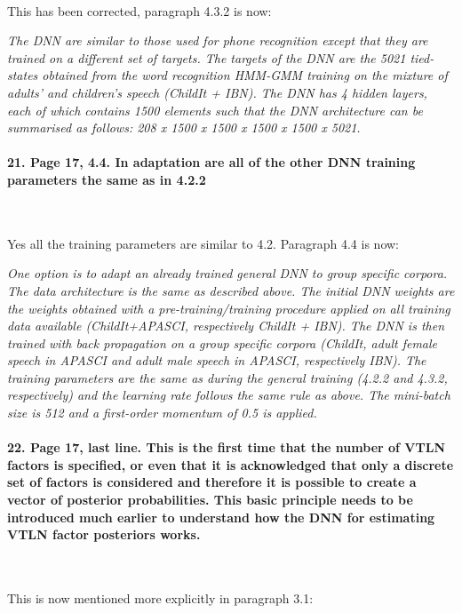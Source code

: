 \documentclass[]{article}
\begin{document}
~

This has been corrected, paragraph 4.3.2 is now:

\textit{The DNN  are similar to those  used for phone  recognition except that they are  trained on a different  set of targets. The  targets of the DNN are the 5021 tied-states obtained from the word recognition HMM-GMM training on the mixture of adults' and children's  speech (ChildIt + IBN). The DNN has 4 hidden  layers, each of which  contains 1500 elements  such that the DNN architecture  can be summarised  as follows: 208  x 1500 x  1500 x 1500 x 1500 x 5021.}

\paragraph{21. Page 17, 4.4. In adaptation are all of the other DNN training parameters the same as in 4.2.2}

~

Yes all the training parameters are similar to 4.2. Paragraph 4.4 is now:

\textit{One option is to adapt an already trained general DNN  to group specific corpora. The data architecture is the same as described above. The initial DNN weights are the weights obtained with a pre-training/training procedure applied on all training data available  (ChildIt+APASCI, respectively ChildIt + IBN). The DNN is then trained with back propagation on a group specific corpora (ChildIt, adult female speech in APASCI and adult male speech in APASCI, respectively IBN). The training parameters are the same as during the general training (4.2.2 and 4.3.2, respectively) and the learning rate follows the same rule as above. The mini-batch size is 512 and a first-order momentum of 0.5 is applied.}

\paragraph{22. Page 17, last line. This is the first time that the number of VTLN factors is specified, or even that it is acknowledged that only a discrete set of factors is considered and therefore it is possible to create a vector of posterior probabilities. This basic principle needs to be introduced much earlier to understand how the DNN for estimating VTLN factor posteriors works.}

~

This is now mentioned more explicitly in paragraph 3.1: 
\end{document}
